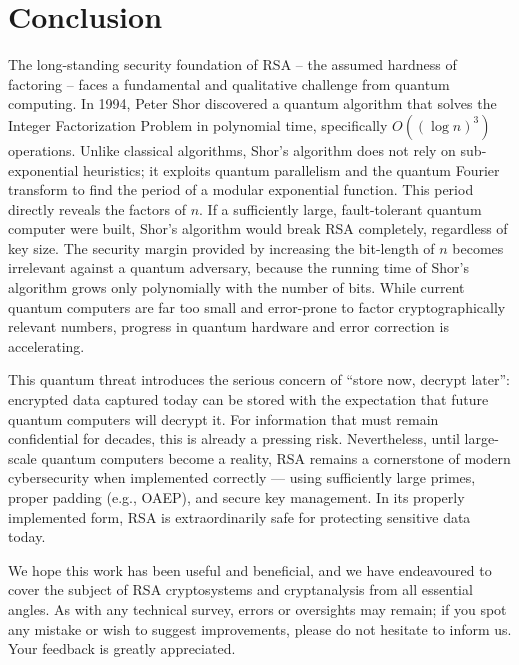 \chapter{Conclusion}

The long-standing security foundation of RSA – the assumed hardness of factoring – faces a fundamental and qualitative challenge from quantum computing. In 1994, Peter Shor discovered a quantum algorithm that solves the Integer Factorization Problem in polynomial time, specifically \(O((\log n)^3)\) operations. Unlike classical algorithms, Shor's algorithm does not rely on sub-exponential heuristics; it exploits quantum parallelism and the quantum Fourier transform to find the period of a modular exponential function. This period directly reveals the factors of \(n\). If a sufficiently large, fault-tolerant quantum computer were built, Shor's algorithm would break RSA completely, regardless of key size. The security margin provided by increasing the bit-length of \(n\) becomes irrelevant against a quantum adversary, because the running time of Shor's algorithm grows only polynomially with the number of bits. While current quantum computers are far too small and error-prone to factor cryptographically relevant numbers, progress in quantum hardware and error correction is accelerating.

This quantum threat introduces the serious concern of ``store now, decrypt later'': encrypted data captured today can be stored with the expectation that future quantum computers will decrypt it. For information that must remain confidential for decades, this is already a pressing risk. Nevertheless, until large-scale quantum computers become a reality, RSA remains a cornerstone of modern cybersecurity when implemented correctly — using sufficiently large primes, proper padding (e.g., OAEP), and secure key management. In its properly implemented form, RSA is extraordinarily safe for protecting sensitive data today.

We hope this work has been useful and beneficial, and we have endeavoured to cover the subject of RSA cryptosystems and cryptanalysis from all essential angles. As with any technical survey, errors or oversights may remain; if you spot any mistake or wish to suggest improvements, please do not hesitate to inform us. Your feedback is greatly appreciated.